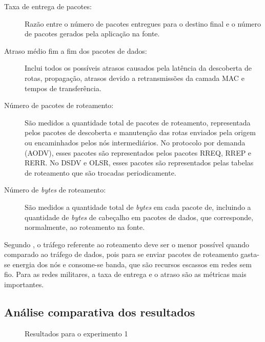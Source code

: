 \begin{description}
	\item[Taxa de entrega de pacotes:] Raz\~ao entre o n\'umero de pacotes entregues para o destino final e o n\'umero de pacotes gerados pela aplica\c{c}\~ao na fonte.
	\item[Atraso m\'edio fim a fim dos pacotes de dados:] Inclui todos os poss\'iveis atrasos causados pela lat\^encia da descoberta de rotas, propaga\c{c}\~ao, atrasos devido a retransmiss\~oes da camada MAC e tempos de transfer\^encia.
	\item[N\'umero de pacotes de roteamento:] S\~ao medidos a quantidade total de pacotes de roteamento, representada pelos pacotes de descoberta e manuten\c{c}\~ao das rotas enviados pela origem ou encaminhados pelos n\'os intermedi\'arios. No protocolo por demanda (AODV), esses pacotes s\~ao representados pelos pacotes RREQ, RREP e RERR. No DSDV e OLSR, esses pacotes s\~ao representados pelas tabelas de roteamento que s\~ao trocadas periodicamente.
	\item[N\'umero de \textit{bytes} de roteamento:] S\~ao medidos a quantidade total de \textit{bytes} em cada pacote de, incluindo a quantidade de \textit{bytes} de cabe\c{c}alho em pacotes de dados, que corresponde, normalmente, ao roteamento na fonte.
\end{description}
Segundo \cite{pereira}, o tr\'afego referente ao roteamento deve ser o menor poss\'ivel quando comparado ao tr\'afego de dados, pois para se enviar pacotes de roteamento gasta-se energia dos n\'os e consome-se banda, que s\~ao recursos escassos em redes sem fio. 
Para as redes militares, a taxa de entrega e o atraso s\~ao as m\'etricas mais importantes.

\subsection{An\'alise comparativa dos resultados}

\begin{figure}[H]
	\centering
	\label{subfig:exp1Lost}
	\label{subfig:exp1Late}
	\label{subfig:exp1Byte}
	\label{subfig:exp1Pkts}
	
	\caption{Resultados para o experimento 1}
	\label{fig:resulExp1}
\end{figure}

